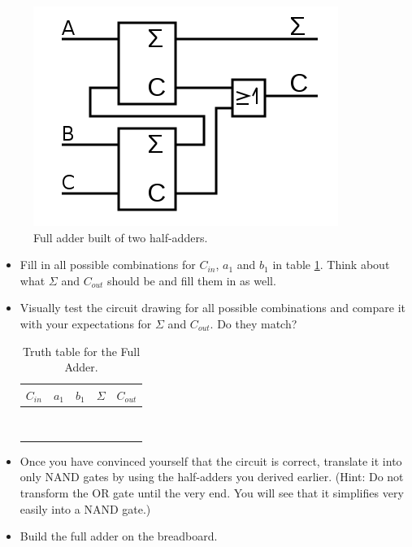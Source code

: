 \documentclass[10pt,a4paper]{article}
\begin{document}
\begin{figure}[H]
	\centering		  
	\includegraphics[scale=0.3]{full_adder.png}
	\caption{Full adder built of two half-adders.}
	\label{fig:full-adder}
\end{figure}
\begin{itemize}
	\item Fill in all possible combinations for $C_{in}$, $a_1$ and $b_1$ in table \ref{tab:full-adder-truth-table}. Think about what $\Sigma$ and $C_{out}$ should be and fill them in as well.
	\item Visually test the circuit drawing for all possible combinations and compare it with your expectations for $\Sigma$ and $C_{out}$. Do they match?
	
	\begin{table}[h]
		\centering
		\begin{tabular}{|c|c|c||c|c|}
			\hline
			$C_{in}$ & $a_1$ & $b_1$ & $\Sigma$ & $C_{out}$ \\ \hline
			&     &     &          &           \\ \hline
			&     &     &          &           \\ \hline
			&     &     &          &           \\ \hline
			&     &     &          &           \\ \hline
			&     &     &          &           \\ \hline
			&     &     &          &           \\ \hline
			&     &     &          &           \\ \hline
			&     &     &          &           \\ \hline
		\end{tabular}
		\caption{Truth table for the Full Adder.}
		\label{tab:full-adder-truth-table}
	\end{table}
	
	\item Once you have convinced yourself that the circuit is correct, translate it into only NAND gates by using the half-adders you derived earlier. (Hint: Do not transform the OR gate until the very end. You will see that it simplifies very easily into a NAND gate.)
	\item Build the full adder on the breadboard.
\end{itemize}
\end{document}

